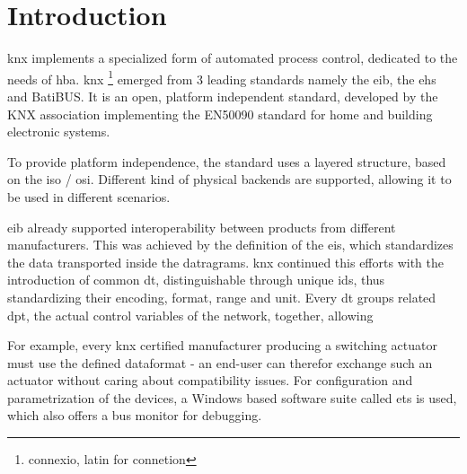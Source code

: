 \section{Introduction}

\gls{knx} implements a specialized form of automated process control, dedicated to the needs of \gls{hba}. \gls{knx} \footnote{connexio, latin for connetion}
emerged from 3 leading standards namely the \gls{eib}, the \gls{ehs} and BatiBUS. It is an open, platform independent standard,
developed by the KNX association implementing the EN50090 standard for home and building electronic systems.

To provide platform independence, the standard uses a layered structure, based on the \gls{iso} / \gls{osi}. Different kind of physical backends are supported,
allowing it to be used in different scenarios.

\gls{eib} already supported interoperability between products from different manufacturers. This was achieved by
the definition of the \gls{eis}, which standardizes
the data transported inside the datragrams. \gls{knx} continued this efforts with the introduction of common \gls{dt}, distinguishable through unique ids, thus
standardizing their encoding, format, range and unit.
Every \gls{dt} groups related \gls{dpt}, the actual control variables of the network, together, allowing 

For example, every \gls{knx} 
certified manufacturer producing a switching actuator must use the defined dataformat - an end-user can therefor exchange such an actuator without caring
about compatibility issues. For configuration and parametrization of the devices, a Windows based software suite called \gls{ets} is used, which also offers
a bus monitor for debugging.
